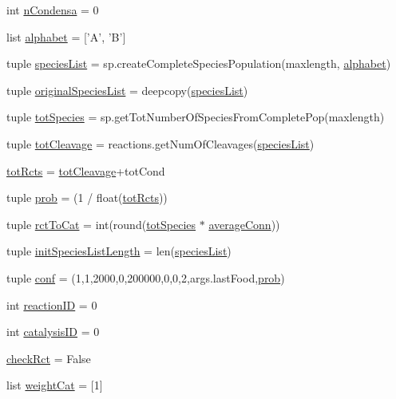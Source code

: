 \begin{DoxyCompactItemize}
int \hyperlink{a00128_a38aa665f11207bbd8cd2da4c382d4aca}{n\-Condensa} = 0
\item 
list \hyperlink{a00128_ab0d9c13eee214bf78b20760bf2835248}{alphabet} = \mbox{[}'A', 'B'\mbox{]}
\item 
tuple \hyperlink{a00128_a5bfc4cfa78ac777159cb0ca9c9c5c2f6}{species\-List} = sp.\-create\-Complete\-Species\-Population(maxlength, \hyperlink{a00128_ab0d9c13eee214bf78b20760bf2835248}{alphabet})
\item 
tuple \hyperlink{a00128_a62b034cfe14eff36f09dd65a51ae7c9c}{original\-Species\-List} = deepcopy(\hyperlink{a00128_a5bfc4cfa78ac777159cb0ca9c9c5c2f6}{species\-List})
\item 
tuple \hyperlink{a00128_ac657414359bc072005d43b2328119a7d}{tot\-Species} = sp.\-get\-Tot\-Number\-Of\-Species\-From\-Complete\-Pop(maxlength)
\item 
tuple \hyperlink{a00128_a1e875e49e1f980d461a398fd6a072b0b}{tot\-Cleavage} = reactions.\-get\-Num\-Of\-Cleavages(\hyperlink{a00128_a5bfc4cfa78ac777159cb0ca9c9c5c2f6}{species\-List})
\item 
\hyperlink{a00128_a059c41eb160321f87ba469fddd20eda7}{tot\-Rcts} = \hyperlink{a00128_a1e875e49e1f980d461a398fd6a072b0b}{tot\-Cleavage}+tot\-Cond
\item 
tuple \hyperlink{a00128_aad2c05e3d2146196ed236911dd796f6e}{prob} = (1 / float(\hyperlink{a00128_a059c41eb160321f87ba469fddd20eda7}{tot\-Rcts}))
\item 
tuple \hyperlink{a00128_afa804d4b1d39a63de9f14e5ab379ae34}{rct\-To\-Cat} = int(round(\hyperlink{a00128_ac657414359bc072005d43b2328119a7d}{tot\-Species} $\ast$ \hyperlink{a00128_a0d59133b2bb42e7aa26a3dba3a2a9a70}{average\-Conn}))
\item 
tuple \hyperlink{a00128_af2370a811b14632a793a28e451be8150}{init\-Species\-List\-Length} = len(\hyperlink{a00128_a5bfc4cfa78ac777159cb0ca9c9c5c2f6}{species\-List})
\item 
tuple \hyperlink{a00128_aa468c4ff92202c7d89fb631e8cb54dc8}{conf} = (1,1,2000,0,200000,0,0,2,args.\-last\-Food,\hyperlink{a00128_aad2c05e3d2146196ed236911dd796f6e}{prob})
\item 
int \hyperlink{a00128_a07d632b487fabd051ab725ee95a85368}{reaction\-I\-D} = 0
\item 
int \hyperlink{a00128_a35953bf84aa0f7a2a3ffa3f68190c0fa}{catalysis\-I\-D} = 0
\item 
\hyperlink{a00128_a6f49caf3b9250cab918ae8dc5aef9931}{check\-Rct} = False
\item 
list \hyperlink{a00128_a67cf979bfd8cf26867524a1a788a5e63}{weight\-Cat} = \mbox{[}1\mbox{]}

\end{DoxyCompactItemize}
